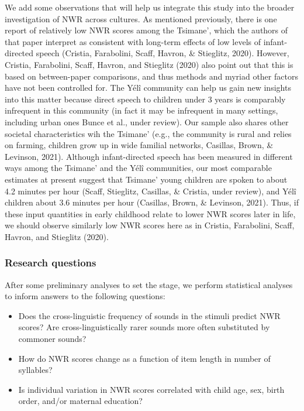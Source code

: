 \documentclass[
  american,
  ,man,floatsintext]{apa6}
\providecommand{\tightlist}{%
  \setlength{\itemsep}{0pt}\setlength{\parskip}{0pt}}
\begin{document}
We add some observations that will help us integrate this study into the broader investigation of NWR across cultures. As mentioned previously, there is one report of relatively low NWR scores among the Tsimane', which the authors of that paper interpret as consistent with long-term effects of low levels of infant-directed speech (Cristia, Farabolini, Scaff, Havron, \& Stieglitz, 2020). However, Cristia, Farabolini, Scaff, Havron, and Stieglitz (2020) also point out that this is based on between-paper comparisons, and thus methods and myriad other factors have not been controlled for. The Yélî community can help us gain new insights into this matter because direct speech to children under 3 years is comparably infrequent in this community (in fact it may be infrequent in many settings, including urban ones Bunce et al., under review). Our sample also shares other societal characteristics wih the Tsimane' (e.g., the community is rural and relies on farming, children grow up in wide familial networks, Casillas, Brown, \& Levinson, 2021). Although infant-directed speech has been measured in different ways among the Tsimane' and the Yélî communities, our most comparable estimates at present suggest that Tsimane' young children are spoken to about 4.2 minutes per hour (Scaff, Stieglitz, Casillas, \& Cristia, under review), and Yélî children about 3.6 minutes per hour (Casillas, Brown, \& Levinson, 2021). Thus, if these input quantities in early childhood relate to lower NWR scores later in life, we should observe similarly low NWR scores here as in Cristia, Farabolini, Scaff, Havron, and Stieglitz (2020).

\hypertarget{research-questions}{%
\subsubsection{Research questions}\label{research-questions}}

After some preliminary analyses to set the stage, we perform statistical analyses to inform answers to the following questions:

\begin{itemize}
\tightlist
\item
  Does the cross-linguistic frequency of sounds in the stimuli predict NWR scores? Are cross-linguistically rarer sounds more often substituted by commoner sounds?
\item
  How do NWR scores change as a function of item length in number of syllables?
\item
  Is individual variation in NWR scores correlated with child age, sex, birth order, and/or maternal education?
\end{itemize}
\end{document}
